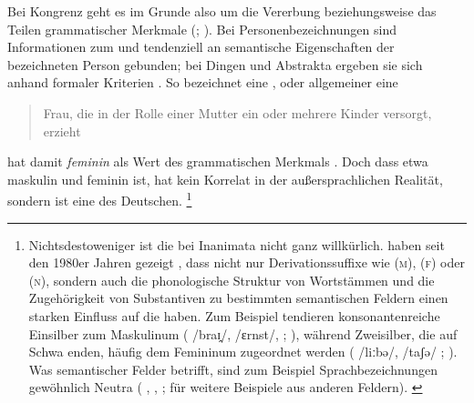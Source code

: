 Bei Kongrenz geht es im Grunde also um die Vererbung beziehungsweise das Teilen
grammatischer Merkmale (;
\cite{corbett2012}). Bei Personenbezeichnungen sind Informationen zum
 und  tendenziell an semantische Eigenschaften der
bezeichneten Person gebunden; bei Dingen und Abstrakta ergeben
sie sich anhand formaler Kriterien \autocites[vgl.][2--4,
125--132]{corbett2006}{koepckezubin2017}. So bezeichnet
 eine ,
oder allgemeiner eine \blockcquote[s.\,v.~]{duden-online}{Frau, die
in der Rolle einer Mutter ein oder mehrere Kinder versorgt, erzieht}.
 hat damit \emph{feminin} als Wert des grammatischen
Merkmals \emph{}. Doch dass etwa 
maskulin und  feminin ist, hat kein Korrelat in der außersprachlichen
Realität, sondern ist eine  des Deutschen.%
%
	\footnote{Nichtsdestoweniger ist die  bei
		Inanimata nicht ganz willkürlich.
		\citeauthor{koepckezubin2017} haben seit den 1980er Jahren gezeigt
		\autocites[z.\,B.][]%
			{koepcke1982}%
			{koepckezubin1996}%
			{koepckezubin2009}%
			{koepckezubin2017},
		dass nicht nur Derivationssuffixe wie
			 (\textsc{m}),
			 (\textsc{f}) oder
			 (\textsc{n}),
		sondern auch die phonologische Struktur von Wortstämmen und die
		Zugehörigkeit von Substantiven zu bestimmten semantischen Feldern einen
		starken Einfluss auf die  haben. Zum Beispiel
		tendieren konsonantenreiche Einsilber zum Maskulinum (%
			 /braɪ̯/,
			/ɛrnst/,
			;
		\cite[vgl.][475--479]{koepckezubin1996}), während Zweisilber, die auf
		Schwa enden, häufig dem Femininum zugeordnet werden (%
			 /liːbə/,
			/taʃə/%
			;
		\cite[vgl.][207--209]{koepckezubin2017}). Was semantischer Felder
		betrifft, sind zum Beispiel Sprachbezeichnungen gewöhnlich Neutra (%
			,
			,
			;
		\cites[siehe]%
			[480]{koepckezubin1996}%
			[137--139]{koepckezubin2009}%
			[210--214]{koepckezubin2017}
		für weitere Beispiele aus anderen Feldern).%
		\label{fn:koepckezubin}
	}

